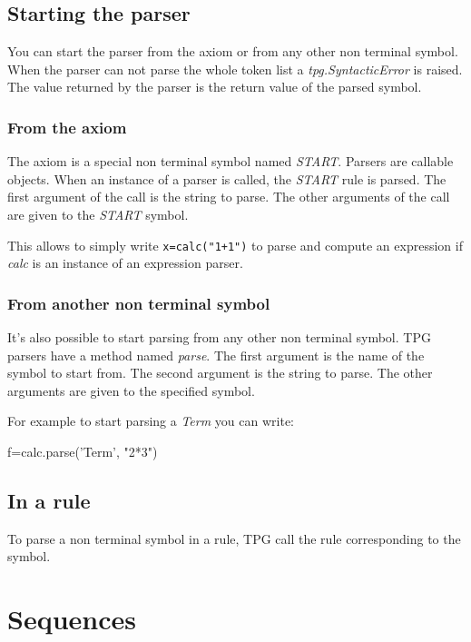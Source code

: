 \subsection{Starting the parser}

You can start the parser from the axiom or from any other non terminal symbol.
When the parser can not parse the whole token list a \emph{tpg.SyntacticError} is raised.
The value returned by the parser is the return value of the parsed symbol.

\subsubsection{From the axiom}

The axiom is a special non terminal symbol named \emph{START}.
Parsers are callable objects.
When an instance of a parser is called, the \emph{START} rule is parsed.
The first argument of the call is the string to parse.
The other arguments of the call are given to the \emph{START} symbol.

This allows to simply write \verb!x=calc("1+1")! to parse and compute an expression if \emph{calc} is an instance of an expression parser.

\subsubsection{From another non terminal symbol}

It's also possible to start parsing from any other non terminal symbol.
TPG parsers have a method named \emph{parse}.
The first argument is the name of the symbol to start from.
The second argument is the string to parse.
The other arguments are given to the specified symbol.

For example to start parsing a \emph{Term}
you can write:
\begin{verbatimtab}[4]
    f=calc.parse('Term', "2*3")
\end{verbatimtab}

\subsection{In a rule}

To parse a non terminal symbol in a rule, TPG call the rule corresponding to the symbol.

\section{Sequences}                                             \label{parser:sequences}

